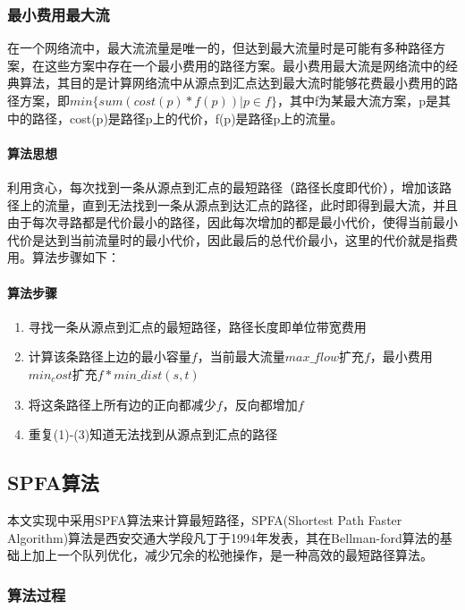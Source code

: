 \documentclass[a4paper,11pt,onecolumn,twoside]{article}
\begin{document}
\begin{multicols}{2}
\subsubsection{最小费用最大流}

在一个网络流中，最大流流量是唯一的，但达到最大流量时是可能有多种路径方案，在这些方案中存在一个最小费用的路径方案。最小费用最大流是网络流中的经典算法，其目的是计算网络流中从源点到汇点达到最大流时能够花费最小费用的路径方案，即$min\{sum(cost(p)*f(p)) | p \in f\}$，其中f为某最大流方案，p是其中的路径，cost(p)是路径p上的代价，f(p)是路径p上的流量。

\paragraph{算法思想}

利用贪心，每次找到一条从源点到汇点的最短路径（路径长度即代价），增加该路径上的流量，直到无法找到一条从源点到达汇点的路径，此时即得到最大流，并且由于每次寻路都是代价最小的路径，因此每次增加的都是最小代价，使得当前最小代价是达到当前流量时的最小代价，因此最后的总代价最小，这里的代价就是指费用。算法步骤如下：

\paragraph{算法步骤}

\begin{enumerate}[(1)]
\item 寻找一条从源点到汇点的最短路径，路径长度即单位带宽费用
\item 计算该条路径上边的最小容量$f$，当前最大流量$max\_flow$扩充$f$，最小费用$min_cost$扩充$f*min\_dist(s,t)$
\item 将这条路径上所有边的正向都减少$f$，反向都增加$f$
\item 重复(1)-(3)知道无法找到从源点到汇点的路径
\end{enumerate}

\subsection{SPFA算法}

本文实现中采用SPFA算法来计算最短路径，SPFA(Shortest Path Faster Algorithm)算法是西安交通大学段凡丁于1994年发表，其在Bellman-ford算法的基础上加上一个队列优化，减少冗余的松弛操作，是一种高效的最短路径算法。

\subsubsection{算法过程}


\end{multicols}
\end{document}
